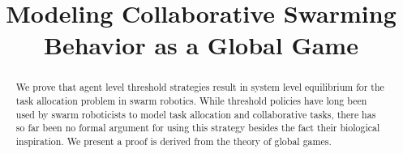 \documentclass[conference]{ieeeconf}
\begin{document}
\title{Modeling Collaborative Swarming Behavior as a Global Game}

\author{
\and
{}
}

\maketitle

\begin{abstract}
We prove that agent level threshold strategies result in system level equilibrium for the task allocation problem in swarm robotics. While threshold policies have long been used by swarm roboticists to model task allocation and collaborative tasks, there has so far been no formal argument for using this strategy besides the fact their biological inspiration. We present a proof is derived from the theory of global games.
\end{abstract}

\IEEEpeerreviewmaketitle

\end{document}
